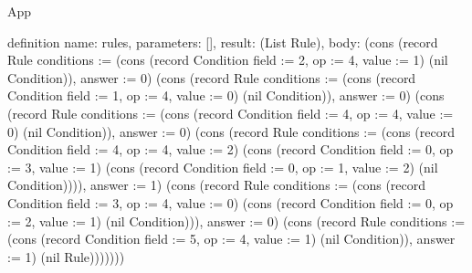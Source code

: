 \begin{lexlean}{App}
\begin{semanticmodule}
definition{
  name: rules,
  parameters: [],
  result: (List Rule),
  body: (cons (record Rule {conditions := (cons (record Condition {field := 2, op := 4, value := 1}) (nil Condition)), answer := 0}) (cons (record Rule {conditions := (cons (record Condition {field := 1, op := 4, value := 0}) (nil Condition)), answer := 0}) (cons (record Rule {conditions := (cons (record Condition {field := 4, op := 4, value := 0}) (nil Condition)), answer := 0}) (cons (record Rule {conditions := (cons (record Condition {field := 4, op := 4, value := 2}) (cons (record Condition {field := 0, op := 3, value := 1}) (cons (record Condition {field := 0, op := 1, value := 2}) (nil Condition)))), answer := 1}) (cons (record Rule {conditions := (cons (record Condition {field := 3, op := 4, value := 0}) (cons (record Condition {field := 0, op := 2, value := 1}) (nil Condition))), answer := 0}) (cons (record Rule {conditions := (cons (record Condition {field := 5, op := 4, value := 1}) (nil Condition)), answer := 1}) (nil Rule)))))))
}


\end{semanticmodule}
\end{lexlean}
